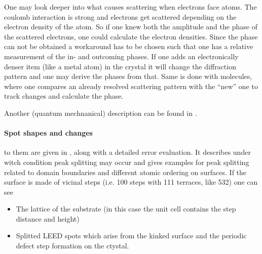 One may look deeper into what causes scattering when electrons face atoms. The coulomb interaction is strong and electrons get scattered depending on the electron density of the atom. So if one knew both the amplitude and the phase of the scattered electrons, one could calculate the electron densities. Since the phase can not be obtained a workaround has to be chosen such that one has a relative measurement of the in- and outcoming phases. If one adds an electronically denser item (like a metal atom) in the crystal it will change the diffraction pattern and one may derive the phases from that. Same is done with molecules, where one compares an already resolved scattering pattern with the ``new'' one to track changes and calculate the phase.

Another (quantum mechnanical) description can be found in \cite[341]{liuksiutov_two-dimensional_1992}.

\paragraph{Spot shapes and changes} to them are given in \cite[36]{woodruff_modern_1986}, along with a detailed error evaluation. It describes under witch condition peak splitting may occur and gives examples for peak splitting related to domain boundaries and different atomic ordering on surfaces. If the surface is made of vicinal steps (i.e. 100 steps with 111 terraces, like 532) one can see 
\begin{itemize}
 \item The lattice of the substrate (in this case the unit cell contains the step distance and height)
 \item Splitted LEED spots which arise from the kinked surface and the periodic defect step formation on the ctystal\cite[37ff]{riemann_ionic_2002}.
\end{itemize}

